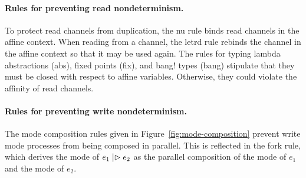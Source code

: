 \paragraph{Rules for preventing read nondeterminism.}
To protect read channels from duplication, the nu rule binds read channels in
the affine context. When reading from a channel, the letrd rule rebinds the
channel in the affine context so that it may be used again. The rules for typing
lambda abstractions (abs), fixed points (fix), and bang! types (bang) stipulate
that they must be closed with respect to affine variables. Otherwise, they could
violate the affinity of read channels.\smallskip

\paragraph{Rules for preventing write nondeterminism.}
The mode composition rules given in Figure~\ref{fig:mode-composition} prevent
write mode processes from being composed in parallel. This is reflected in the
fork rule, which derives the mode of $e_1 \mathrel{|\rhd} e_2$ as the parallel
composition of the mode of $e_1$ and the mode of $e_2$.

